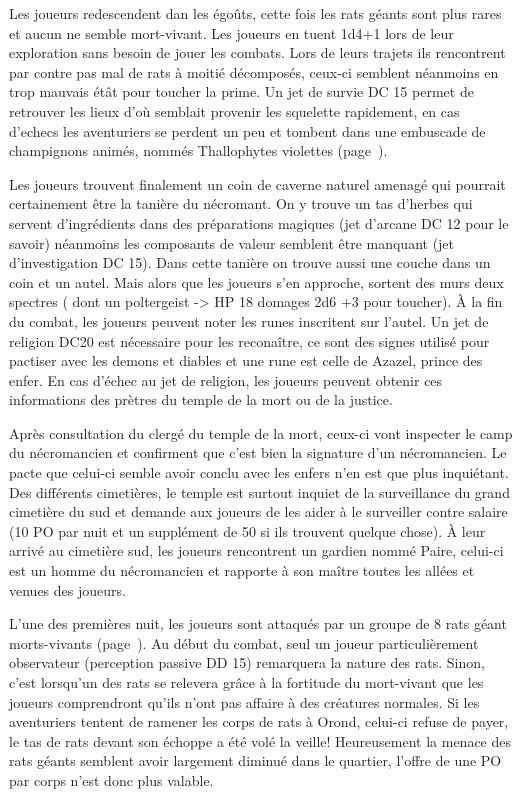 Les joueurs redescendent dan les égoûts, cette fois les rats géants sont plus rares et aucun ne semble 
mort-vivant. Les joueurs en tuent 1d4+1 lors de leur exploration sans besoin de jouer les combats. Lors de
leurs trajets ils rencontrent par contre pas mal de rats à moitié décomposés, ceux-ci semblent néanmoins
en trop mauvais étât pour toucher la prime. Un jet de survie DC 15 permet de retrouver les lieux d'où 
semblait provenir les squelette rapidement, en cas d'echecs les aventuriers se perdent un peu et tombent 
dans une embuscade de champignons animés, nommés Thallophytes violettes (page~\pageref{ThallophyteViolette}).

Les joueurs trouvent finalement un coin de caverne naturel amenagé qui pourrait certainement être la tanière
du nécromant. On y trouve un tas d'herbes qui servent d'ingrédients dans des préparations magiques (jet 
d'arcane DC 12 pour le savoir) néanmoins les composants de valeur semblent être manquant (jet d'investigation
DC 15). Dans cette tanière on trouve aussi une couche dans un coin et un autel. Mais alors que les joueurs
s'en approche, sortent des murs deux spectres (\pageref{Spectre} dont un poltergeist -> HP 18 
domages 2d6 +3 pour toucher). À la fin du combat, les joueurs peuvent noter les runes inscritent sur l'autel.
Un jet de religion DC20 est nécessaire pour les reconaître, ce sont des signes utilisé pour pactiser avec
les demons et diables et une rune est celle de Azazel, prince des enfer. En cas d'échec au jet de religion, 
les joueurs peuvent obtenir ces informations des prètres du temple de la mort ou de la justice.

Après consultation du clergé du temple de la mort, ceux-ci vont inspecter le camp du nécromancien et 
confirment que c'est bien la signature d'un nécromancien. Le pacte que celui-ci semble avoir conclu avec les 
enfers n'en est que plus inquiétant. Des différents cimetières, le temple est surtout inquiet de la 
surveillance du grand cimetière du sud et demande aux joueurs de les aider à le surveiller contre salaire 
(10 PO par nuit et un supplément de 50 si ils trouvent quelque chose). À leur arrivé au cimetière sud,
les joueurs rencontrent un gardien nommé Paire, celui-ci est un homme du nécromancien et rapporte à son 
maître toutes les allées et venues des joueurs.


L'une des premières nuit, les joueurs sont attaqués par un groupe de 8 rats géant morts-vivants 
(page~\pageref{}). Au début du combat, seul un 
joueur particulièrement observateur (perception passive DD 15) remarquera la nature des rats. Sinon, c'est 
lorsqu'un des rats se relevera grâce à la fortitude du mort-vivant que les joueurs comprendront qu'ils
n'ont pas affaire à des créatures normales. Si les aventuriers tentent de ramener les corps de rats à Orond,
celui-ci refuse de payer, le tas de rats devant son échoppe a été volé la veille! Heureusement la menace
des rats géants semblent avoir largement diminué dans le quartier, l'offre de une PO par corps n'est donc
plus valable.

